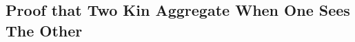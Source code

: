 \documentclass[conference]{IEEEtran}
\begin{document}
  \subsection{Proof that Two Kin Aggregate When One Sees The Other} \label{thm:two_agg}
\end{document}
